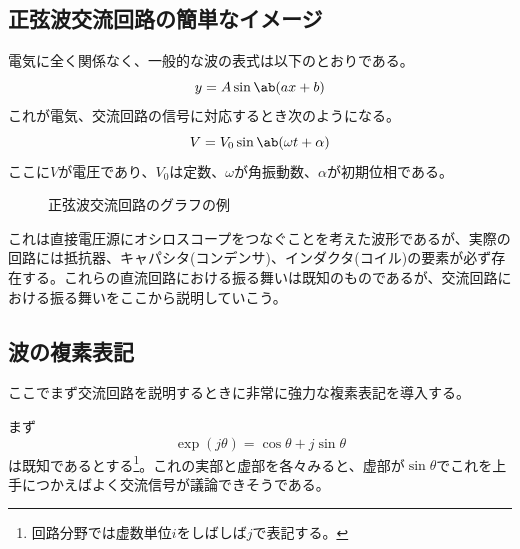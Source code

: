 \documentclass[fontsize=10.5pt]{jlreq}
\begin{document}
\subsection{正弦波交流回路の簡単なイメージ}
電気に全く関係なく、一般的な波の表式は以下のとおりである。
\begin{equation}
    y=A\sin\ab(a x + b)
\end{equation}
これが電気、交流回路の信号に対応するとき次のようになる。
\[V = V_{0}\sin\ab(\omega t + \alpha)\]
ここに\(V\)が電圧であり、\(V_0\)は定数、\(\omega\)が角振動数、\(\alpha\)が初期位相である。
\begin{figure}[htbp]
    \centering
    \caption{正弦波交流回路のグラフの例}
    \label{fig.ac_circuit_graph}
\end{figure}
これは直接電圧源にオシロスコープをつなぐことを考えた波形であるが、実際の回路には抵抗器、キャパシタ(コンデンサ)、インダクタ(コイル)の要素が必ず存在する。これらの直流回路における振る舞いは既知のものであるが、交流回路における振る舞いをここから説明していこう。
\subsection{波の複素表記}
ここでまず交流回路を説明するときに非常に強力な複素表記を導入する。

まず
\begin{equation}
    \exp(j\theta) = \cos\theta + j\sin\theta
\end{equation}
は既知であるとする\footnote{回路分野では虚数単位\(i\)をしばしば\(j\)で表記する。}。これの実部と虚部を各々みると、虚部が\(\sin \theta\)でこれを上手につかえばよく交流信号が議論できそうである。
\end{document}
